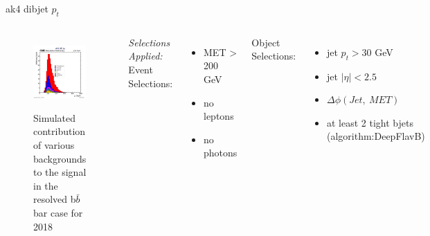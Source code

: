 \documentclass[10pt,xcolor=dvipsnames]{beamer}
\begin{document}
\begin{frame}[fragile]{ak4 dibjet $p_t$}
  \begin{columns}
    \begin{figure}
      \centering
      \includegraphics[width=1\textwidth]{../Backgrounds/plots/SR_Resolved_Backgrounds_dijets_pt_Combined.png}
      \label{contribution}
      \caption{Simulated contribution of various backgrounds to the signal in the resolved b$ \bar{b} $ bar case for 2018}
    \end{figure}
    \textit{Selections Applied:} \\
    Event Selections:
    \begin{itemize}
      \raggedright 
      \tiny
      \item {MET > 200 GeV}
      \item {no leptons}
      \item {no photons}
    \end{itemize}
    Object Selections:
    \begin{itemize}
      \raggedright 
      \tiny
      \item {jet $p_t > 30 $ GeV}
      \item {jet $| \eta | < 2.5 $}
      \item {$\Delta \phi (Jet, \ MET)$}
      \item {at least 2 tight bjets (algorithm:DeepFlavB)}

\end{itemize}
\end{columns}
\end{frame}
\end{document}
